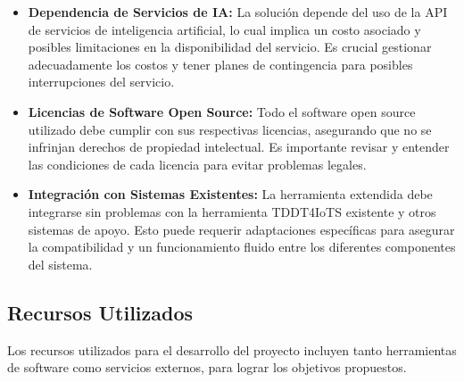 \begin{itemize}
	\item \textbf{Dependencia de Servicios de IA:}
	La solución depende del uso de la API de servicios de inteligencia artificial, lo cual implica un costo asociado y posibles limitaciones en la disponibilidad del servicio. Es crucial gestionar adecuadamente los costos y tener planes de contingencia para posibles interrupciones del servicio.
	
	\item \textbf{Licencias de Software Open Source:}
	Todo el software open source utilizado debe cumplir con sus respectivas licencias, asegurando que no se infrinjan derechos de propiedad intelectual. Es importante revisar y entender las condiciones de cada licencia para evitar problemas legales.
	
	\item \textbf{Integración con Sistemas Existentes:}
	La herramienta extendida debe integrarse sin problemas con la herramienta TDDT4IoTS existente y otros sistemas de apoyo. Esto puede requerir adaptaciones específicas para asegurar la compatibilidad y un funcionamiento fluido entre los diferentes componentes del sistema.
\end{itemize}

\subsection{Recursos Utilizados}

Los recursos utilizados para el desarrollo del proyecto incluyen tanto herramientas de software como servicios externos, para lograr los objetivos propuestos.

